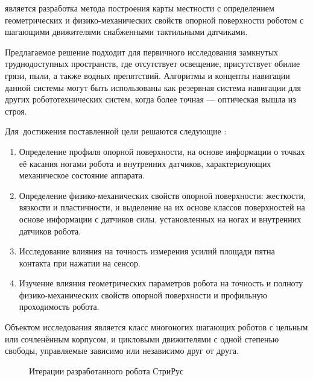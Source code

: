 {\aim} является разработка метода построения карты местности с определением геометрических и физико-механических свойств опорной поверхности роботом с шагающими движителями снабженными тактильными датчиками.

Предлагаемое решение подходит для первичного исследования замкнутых труднодоступных пространств, где отсутствует освещение, присутствует обилие грязи, пыли, а также водных препятствий. Алгоритмы и концепты навигации данной системы могут быть использованы как резервная система навигации для других робототехнических систем, когда более точная --- оптическая вышла из строя.

Для~достижения поставленной цели решаются следующие {\tasks}:
\begin{enumerate}[beginpenalty=10000] %
    \item Определение профиля опорной поверхности, на основе информации о точках её касания ногами робота и внутренних датчиков, характеризующих механическое состояние аппарата.
    \item Определение физико-механических свойств опорной поверхности: жесткости, вязкости и пластичности, и выделение на их основе классов поверхностей на основе информации с датчиков силы, установленных на ногах и внутренних датчиков робота.
    \item Исследование влияния на точность измерения усилий площади пятна контакта при нажатии на сенсор.
    \item Изучение влияния геометрических параметров робота на точность и полноту физико-механических свойств опорной поверхности и профильную проходимость робота.
\end{enumerate}

{\researchobj}
Объектом исследования является класс многоногих шагающих роботов с цельным или сочленённым корпусом, и цикловыми движителями с одной степенью свободы, управляемые зависимо или независимо друг от друга.

\begin{figure}[H]
    \caption{Итерации разработанного робота СтриРус}\label{fig:striruses}
  \end{figure}

